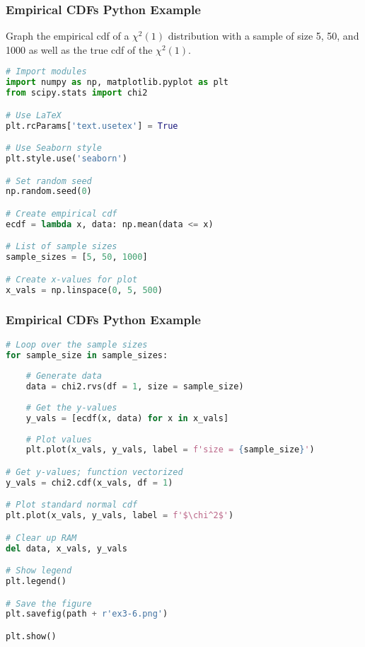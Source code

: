 \documentclass{beamer}
\begin{document}
\begin{frame}[fragile]
\frametitle{Empirical CDFs Python Example}
\small
\begin{Example}
Graph the empirical cdf of a $\chi^2(1)$ distribution with a sample of size 5, 50, and 1000 as well as the true cdf of the $\chi^2(1)$.
\end{Example}

\begin{lstlisting}[language=Python]
# Import modules
import numpy as np, matplotlib.pyplot as plt
from scipy.stats import chi2

# Use LaTeX
plt.rcParams['text.usetex'] = True

# Use Seaborn style
plt.style.use('seaborn')

# Set random seed
np.random.seed(0)

# Create empirical cdf
ecdf = lambda x, data: np.mean(data <= x)

# List of sample sizes
sample_sizes = [5, 50, 1000]

# Create x-values for plot
x_vals = np.linspace(0, 5, 500)
\end{lstlisting}

\end{frame}

\begin{frame}[fragile]
\frametitle{Empirical CDFs Python Example}

\begin{lstlisting}[language=Python]
# Loop over the sample sizes
for sample_size in sample_sizes:
    
    # Generate data
    data = chi2.rvs(df = 1, size = sample_size)
    
    # Get the y-values
    y_vals = [ecdf(x, data) for x in x_vals]
    
    # Plot values
    plt.plot(x_vals, y_vals, label = f'size = {sample_size}')

# Get y-values; function vectorized
y_vals = chi2.cdf(x_vals, df = 1)

# Plot standard normal cdf
plt.plot(x_vals, y_vals, label = f'$\chi^2$')

# Clear up RAM
del data, x_vals, y_vals

# Show legend
plt.legend()

# Save the figure
plt.savefig(path + r'ex3-6.png')

plt.show()
\end{lstlisting}

\end{frame}
\end{document}
